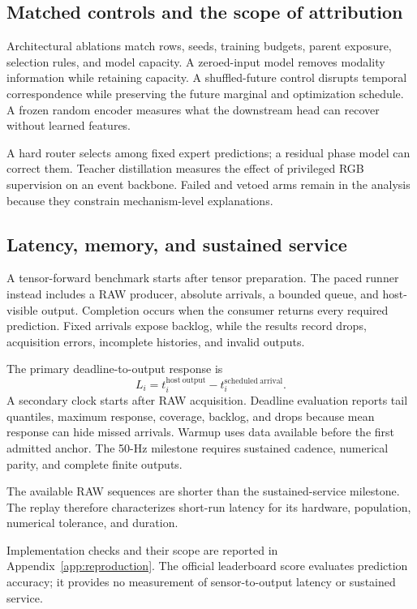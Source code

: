 \subsection{Matched controls and the scope of attribution}
Architectural ablations match rows, seeds, training budgets, parent exposure, selection rules, and model capacity. A zeroed-input model removes modality information while retaining capacity. A shuffled-future control disrupts temporal correspondence while preserving the future marginal and optimization schedule. A frozen random encoder measures what the downstream head can recover without learned features.

A hard router selects among fixed expert predictions; a residual phase model can correct them. Teacher distillation measures the effect of privileged RGB supervision on an event backbone. Failed and vetoed arms remain in the analysis because they constrain mechanism-level explanations.

\subsection{Latency, memory, and sustained service}
A tensor-forward benchmark starts after tensor preparation. The paced runner instead includes a RAW producer, absolute arrivals, a bounded queue, and host-visible output. Completion occurs when the consumer returns every required prediction. Fixed arrivals expose backlog, while the results record drops, acquisition errors, incomplete histories, and invalid outputs. 

The primary deadline-to-output response is
\begin{equation}
 L_i=t_i^{\mathrm{host\ output}}-t_i^{\mathrm{scheduled\ arrival}}.
\end{equation}
A secondary clock starts after RAW acquisition. Deadline evaluation reports tail quantiles, maximum response, coverage, backlog, and drops because mean response can hide missed arrivals. Warmup uses data available before the first admitted anchor. The 50-Hz milestone requires sustained cadence, numerical parity, and complete finite outputs. 

The available RAW sequences are shorter than the sustained-service milestone. The replay therefore characterizes short-run latency for its hardware, population, numerical tolerance, and duration.

Implementation checks and their scope are reported in Appendix~\ref{app:reproduction}. The official leaderboard score evaluates prediction accuracy; it provides no measurement of sensor-to-output latency or sustained service. 
